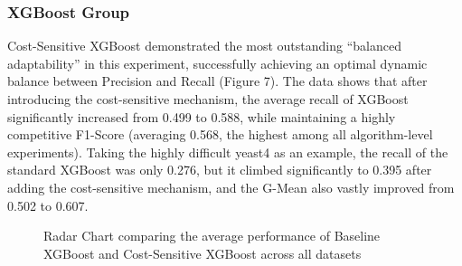 \documentclass[sigconf]{acmart}
\begin{document}
\subsubsection{XGBoost Group}
Cost-Sensitive XGBoost demonstrated the most outstanding ``balanced adaptability'' in this experiment, successfully achieving an optimal dynamic balance between Precision and Recall (Figure 7). The data shows that after introducing the cost-sensitive mechanism, the average recall of XGBoost significantly increased from 0.499 to 0.588, while maintaining a highly competitive F1-Score (averaging 0.568, the highest among all algorithm-level experiments). Taking the highly difficult yeast4 as an example, the recall of the standard XGBoost was only 0.276, but it climbed significantly to 0.395 after adding the cost-sensitive mechanism, and the G-Mean also vastly improved from 0.502 to 0.607. 

\begin{figure}[h]
    \centering
    \caption{Radar Chart comparing the average performance of Baseline XGBoost and Cost-Sensitive XGBoost across all datasets}
    \label{fig:xgboost_average_radar}
\end{figure}
\end{document}
